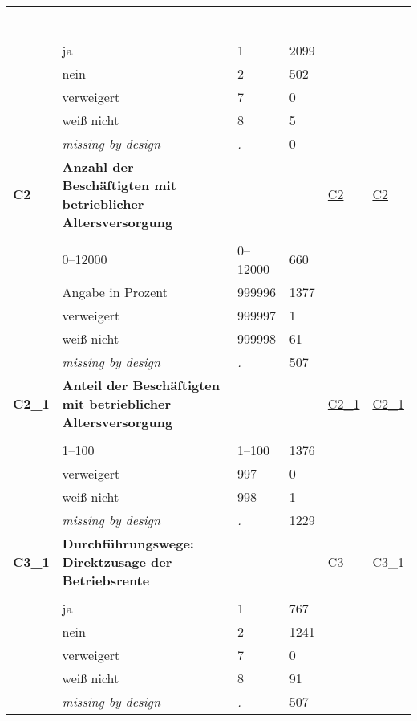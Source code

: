 \begin{longtable}{| L{2.45cm} | L{6cm} | C{1.5cm} | R{1cm} | C{2.25cm} | C{2.25cm} |}
   & \protect\subsection[Variablen C1 bis C27]{} &  &  &  &  \\ 
   & ja & 1 & 2099 &  &  \\ 
   & nein & 2 & 502 &  &  \\ 
   & verweigert & 7 & 0 &  &  \\ 
   & weiß nicht & 8 & 5 &  &  \\ 
   & \textit{missing by design} & \textit{.} & 0 &  &  \\ 
   \midrule
\textbf{C2}\label{var:C2} & \textbf{Anzahl der Beschäftigten mit betrieblicher Altersversorgung} &  &  & \hyperref[C2]{C2} & \hyperref[var:suf:C2]{C2} \\ 
   &  &  &  &  &  \\ 
   & 0--12000 & 0--12000 & 660 &  &  \\ 
   & Angabe in Prozent & 999996 & 1377 &  &  \\ 
   & verweigert & 999997 & 1 &  &  \\ 
   & weiß nicht & 999998 & 61 &  &  \\ 
   & \textit{missing by design} & \textit{.} & 507 &  &  \\ 
   \midrule
\textbf{C2\_1}\label{var:C2:1} & \textbf{Anteil der Beschäftigten mit betrieblicher Altersversorgung} &  &  & \hyperref[C2:1]{C2\_1} & \hyperref[var:suf:C2:1]{C2\_1} \\ 
   &  &  &  &  &  \\ 
   & 1--100 & 1--100 & 1376 &  &  \\ 
   & verweigert & 997 & 0 &  &  \\ 
   & weiß nicht & 998 & 1 &  &  \\ 
   & \textit{missing by design} & \textit{.} & 1229 &  &  \\ 
   \midrule
\textbf{C3\_1}\label{var:C3:1} & \textbf{Durchführungswege: Direktzusage der Betriebsrente} &  &  & \hyperref[C3]{C3} & \hyperref[var:suf:C3:1]{C3\_1} \\ 
   &  &  &  &  &  \\ 
   & ja & 1 & 767 &  &  \\ 
   & nein & 2 & 1241 &  &  \\ 
   & verweigert & 7 & 0 &  &  \\ 
   & weiß nicht & 8 & 91 &  &  \\ 
   & \textit{missing by design} & \textit{.} & 507 &  &  \\ 

\end{longtable}
